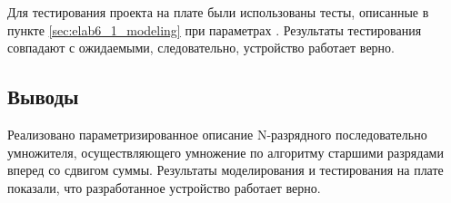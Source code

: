 Для тестирования проекта на плате были использованы тесты, описанные в пункте \ref{sec:elab6_1_modeling} при параметрах . Результаты тестирования совпадают с ожидаемыми, следовательно, устройство работает верно.

\subsection{Выводы}

Реализовано параметризированное описание N-разрядного последовательно умножителя, осуществляющего умножение по алгоритму старшими разрядами вперед со сдвигом суммы. Результаты моделирования и тестирования на плате показали, что разработанное устройство работает верно.

